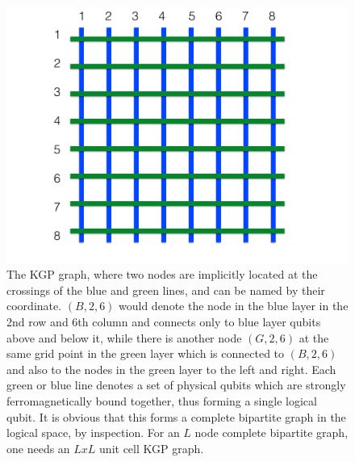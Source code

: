 \documentclass[superscriptaddress,showpacs,reprint]{revtex4-1}
\begin{document}
\begin{figure}[hbt]
  \includegraphics[width=\textwidth/2]{rowsncolumns}
  \caption{The KGP graph, where two nodes are implicitly located at the crossings of the blue and green lines, and can be named by their coordinate. $(B,2,6)$ would denote the node in the blue layer in the 2nd row and 6th column and connects only to blue layer qubits above and below it, while there is another node $(G,2,6)$ at the same grid point in the green layer which is connected to $(B,2,6)$ and also to the nodes in the green layer to the left and right. Each green or blue line denotes a set of physical qubits which are strongly ferromagnetically bound together, thus forming a single logical qubit. It is obvious that this forms a complete bipartite graph in the logical space, by inspection. For an $L$ node complete bipartite graph, one needs an $LxL$ unit cell KGP graph.}
  \label{fig:kgp2bipartite}
\end{figure}
\end{document}
